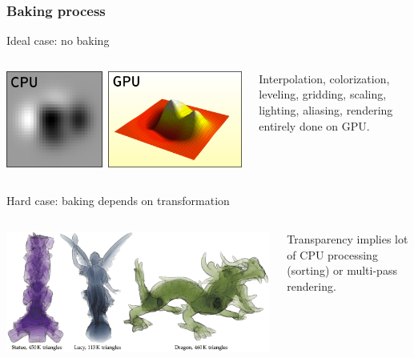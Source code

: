 \documentclass[10pt]{beamer}
\begin{document}
\begin{frame}
  \frametitle{Baking process}
  \begin{block}{Ideal case: no baking}
    \begin{columns}
      \begin{column}{.50\textwidth}
        \begin{center}
          \includegraphics[width=\textwidth]{glumpy.png}
        \end{center}
      \end{column}
      \begin{column}{.40\textwidth}
        Interpolation, colorization, leveling, gridding, scaling, lighting,
        aliasing, rendering entirely done on GPU.
      \end{column}
    \end{columns}
  \end{block}
  \begin{block}{Hard case: baking depends on transformation}
    \begin{columns}
      \begin{column}{.50\textwidth}
        \begin{center}
          \includegraphics[width=\textwidth]{transparency}
        \end{center}
      \end{column}
      \begin{column}{.40\textwidth}
        Transparency implies lot of CPU processing (sorting) or multi-pass
        rendering.
      \end{column}
    \end{columns}
  \end{block}
\end{frame}
\end{document}
